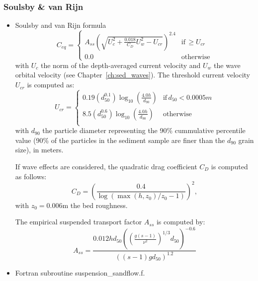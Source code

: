 \subsubsection{Soulsby \& van Rijn}
\begin{itemize}
\item Soulsby and van Rijn formula~\cite{Soulsby97} 
  \begin{equation*}
C_{eq}=\left\{\begin{array}{ll}
A_{ss}\left(\sqrt{U_c^2+\frac{0.018}{C_D}U_w^2-U_{cr}}\right)^{2.4} & \text{if}\, \geq U_{cr}\\
0.0 &  \text{otherwise}
\end{array}
\right.
\end{equation*}
  with $U_c$ the norm of the depth-averaged current velocity and $U_w$ the wave orbital velocity (see Chapter~\ref{ch:sed_waves}). The threshold current velocity $U_{cr}$ is computed as:
\begin{equation*}
U_{cr}=\left\{\begin{array}{ll}
  0.19 (d_{50}^{0.1})\log_{10}\left(\frac{4.0 h}{d_{90}}\right) & \text{if}\, d_{50} < 0.0005 m\\
  8.5 (d_{50}^{0.6})\log_{10}\left(\frac{4.0 h}{d_{90}}\right) & \text{otherwise}\\
\end{array}
\right.
\end{equation*}
with $d_{90}$ the particle diameter representing the 90\% cummulative percentile value (90\% of the particles in the sediment sample are finer than the $d_{90}$ grain size), in meters.

If wave effects are considered, the quadratic drag coefficient $C_D$ is computed as follows:
\begin{equation*}
  C_D = \left(\frac{0.4}{\log(\max(h, z_{0})/z_{0}-1)}\right)^{2},
\end{equation*}
with $z_{0}=0.006$m the bed roughness.

The empirical suspended transport factor $A_{ss}$ is computed by:
\begin{equation*}
A_{ss} = \frac{0.012 h d_{50} \left(\left(\frac{g(s-1)}{\nu^2}\right)^{1/3}d_{50}\right)^{-0.6}}{\left((s-1)g d_{50}\right)^{1.2}}
\end{equation*}
\item Fortran subroutine {\ttfamily suspension\_sandflow.f}.
\end{itemize}

